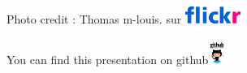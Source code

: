 \documentclass[newPxFont]{beamer}
\begin{document}
{
%
\begin{frame}
  \vspace{-1em}  
  \begin{minipage}[t][.8\textheight]{\textwidth}

    \vfill

  \hfill \small{Photo credit : Thomas m-louis. sur \includegraphics[height=0.55cm]{img/flickr_logo}}
  \end{minipage}
  \vspace{-3em}
  \centering
	You can find this presentation on github\includegraphics[height=0.85cm]{img/github}  
  
\end{frame}
}
\end{document}
